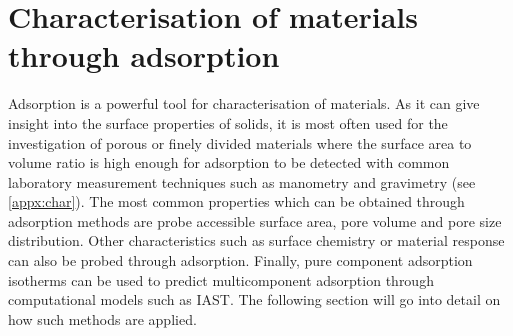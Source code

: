 
\section{Characterisation of materials through adsorption}

Adsorption is a powerful tool for characterisation of materials.
As it can give insight into the surface properties of solids, it
is most often used for the investigation of porous or finely
divided materials where the surface area to volume ratio is
high enough for adsorption to be detected with common laboratory
measurement techniques such as manometry and gravimetry (see
\autoref{appx:char}). The most common properties which can
be obtained through adsorption methods are probe accessible
surface area, pore volume and pore size distribution. Other
characteristics such as surface chemistry or material response
can also be probed through adsorption. Finally, pure component adsorption
isotherms can be used to predict multicomponent adsorption through
computational models such as \gls{IAST}. The following section will go into
detail on how such methods are applied.



